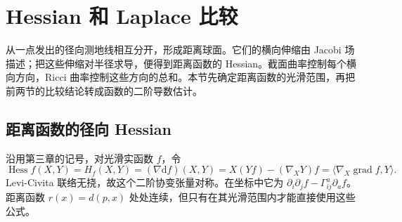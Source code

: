 
% 
% 

\section{Hessian 和 Laplace 比较}
\label{g3:sec:0703}

从一点发出的径向测地线相互分开，形成距离球面。它们的横向伸缩由 Jacobi 场描述；把这些伸缩对半径求导，便得到距离函数的 Hessian。截面曲率控制每个横向方向，Ricci 曲率控制这些方向的总和。本节先确定距离函数的光滑范围，再把前两节的比较结论转成函数的二阶导数估计。

\subsection{距离函数的径向 Hessian}
\label{g3:subsec:0703:01}

沿用第三章的记号，对光滑实函数 \(f\)，令
\[
	\operatorname{Hess}f(X,Y)=H_f(X,Y)
	=(\nabla\mathrm df)(X,Y)
	=X(Yf)-(\nabla_XY)f
	=\langle\nabla_X\operatorname{grad}f,Y\rangle.
\]
Levi-Civita 联络无挠，故这个二阶协变张量对称。在坐标中它为
\(\partial_i\partial_jf-\Gamma^a_{ij}\partial_af\)。
距离函数 \(r(x)=d(p,x)\) 处处连续，但只有在其光滑范围内才能直接使用这些公式。

